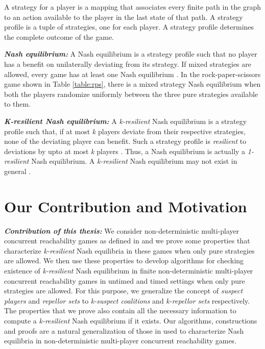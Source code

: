 A strategy for a player is a mapping that associates every finite path in the graph to an action available to the player in the last state of that path. A strategy profile is a tuple of strategies, one for each player. A strategy profile determines the complete outcome of the game.

\textit{\textbf{Nash equilibrium:}} A Nash equilibrium is a strategy profile such that no player has a benefit on unilaterally deviating from its strategy. If mixed strategies are allowed, every game has at least one Nash equilibrium \cite{12}. In the rock-paper-scissors game shown in Table \ref{table:rps}, there is a mixed strategy Nash equilibrium when both the players randomize uniformly between the three pure strategies available to them.

\textit{\textbf{K-resilient Nash equilibrium:}} A \textit{k-resilient} Nash equilibrium is a strategy profile such that, if at most \textit{k} players deviate from their respective strategies, none of the deviating player can benefit. Such a strategy profile is \textit{resilient} to deviations by upto at most \textit{k} players \cite{Abraham-2006,Abraham-2008}. Thus, a Nash equilibrium is actually a \textit{1-resilient} Nash equilibrium. A \textit{k-resilient} Nash equilibrium may not exist in general \cite{Abraham-2006,Abraham-2008}.

\section{Our Contribution and Motivation}

\textit{\textbf{Contribution of this thesis:}} We consider non-deterministic multi-player concurrent reachability games as defined in \cite{BBM-concur10,BBM-report} and we prove some properties that characterize \textit{k-resilient} Nash equilibria in these games when only pure strategies are allowed. We then use these properties to develop algorithms for checking existence of \textit{k-resilient} Nash equilibrium in finite non-deterministic multi-player concurrent reachability games in untimed and timed settings when only pure strategies are allowed. For this purpose, we generalize the concept of \textit{suspect players} \cite{BBM-concur10,BBM-report,BBMU-fsttcs11,Romain-phd} and \textit{repellor sets} \cite{BBM-concur10,BBM-report,BBMU-fsttcs11} to \textit{k-suspect coalitions} and \textit{k-repellor sets} respectively. The properties that we prove also contain all the necessary information to compute a \textit{k-resilient} Nash equilibrium if it exists. Our algorithms, constructions and proofs are a natural generalization of those in \cite{BBM-concur10,BBM-report} used to characterize Nash equilibria in non-deterministic multi-player concurrent reachability games.

